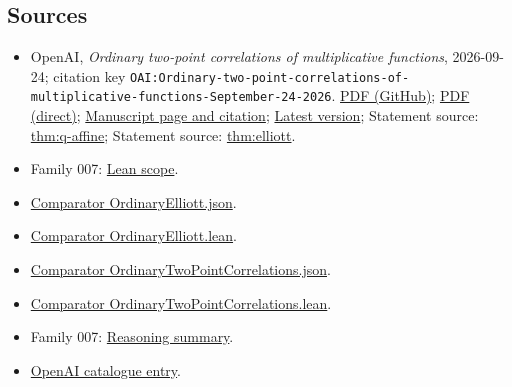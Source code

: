 \documentclass[11pt]{article}
\begin{document}
\subsection{Sources}
\begin{itemize}
\item OpenAI, \emph{Ordinary two-point correlations of multiplicative functions}, 2026-09-24; citation key \texttt{OAI:Ordinary-two-point-correlations-of-multiplicative-functions-September-24-2026}. \href{https://github.com/openai/math/blob/adc7f1241b42e322a6451854ab7e4b4c146bf78a/preprints/Ordinary-two-point-correlations-of-multiplicative-functions-September-24-2026/final.pdf}{PDF (GitHub)}; \href{https://github.com/openai/math/raw/adc7f1241b42e322a6451854ab7e4b4c146bf78a/preprints/Ordinary-two-point-correlations-of-multiplicative-functions-September-24-2026/final.pdf}{PDF (direct)}; \href{https://github.com/openai/math/blob/adc7f1241b42e322a6451854ab7e4b4c146bf78a/preprints/Ordinary-two-point-correlations-of-multiplicative-functions-September-24-2026/README.md}{Manuscript page and citation}; \href{https://github.com/openai/math/blob/main/preprints/Ordinary-two-point-correlations-of-multiplicative-functions-September-24-2026/final.pdf}{Latest version}; Statement source: \href{https://github.com/openai/math/blob/adc7f1241b42e322a6451854ab7e4b4c146bf78a/preprints/Ordinary-two-point-correlations-of-multiplicative-functions-September-24-2026/build/introduction.tex\#L20}{thm:q-affine}; Statement source: \href{https://github.com/openai/math/blob/adc7f1241b42e322a6451854ab7e4b4c146bf78a/preprints/Ordinary-two-point-correlations-of-multiplicative-functions-September-24-2026/build/introduction.tex\#L64}{thm:elliott}.
\item Family 007: \href{https://github.com/openai/math/blob/adc7f1241b42e322a6451854ab7e4b4c146bf78a/lean/docs/007.md}{Lean scope}.
\item \href{https://github.com/openai/math/blob/adc7f1241b42e322a6451854ab7e4b4c146bf78a/lean/ComparatorChallenges/OrdinaryElliott.json}{Comparator OrdinaryElliott.json}.
\item \href{https://github.com/openai/math/blob/adc7f1241b42e322a6451854ab7e4b4c146bf78a/lean/ComparatorChallenges/OrdinaryElliott.lean}{Comparator OrdinaryElliott.lean}.
\item \href{https://github.com/openai/math/blob/adc7f1241b42e322a6451854ab7e4b4c146bf78a/lean/ComparatorChallenges/OrdinaryTwoPointCorrelations.json}{Comparator OrdinaryTwoPointCorrelations.json}.
\item \href{https://github.com/openai/math/blob/adc7f1241b42e322a6451854ab7e4b4c146bf78a/lean/ComparatorChallenges/OrdinaryTwoPointCorrelations.lean}{Comparator OrdinaryTwoPointCorrelations.lean}.
\item Family 007: \href{https://github.com/openai/math/blob/adc7f1241b42e322a6451854ab7e4b4c146bf78a/reasoning\_traces/ordinary-two-point-correlations.pdf}{Reasoning summary}.
\item \href{https://github.com/openai/math/blob/adc7f1241b42e322a6451854ab7e4b4c146bf78a/CONTENTS.md}{OpenAI catalogue entry}.
\end{itemize}
\end{document}
